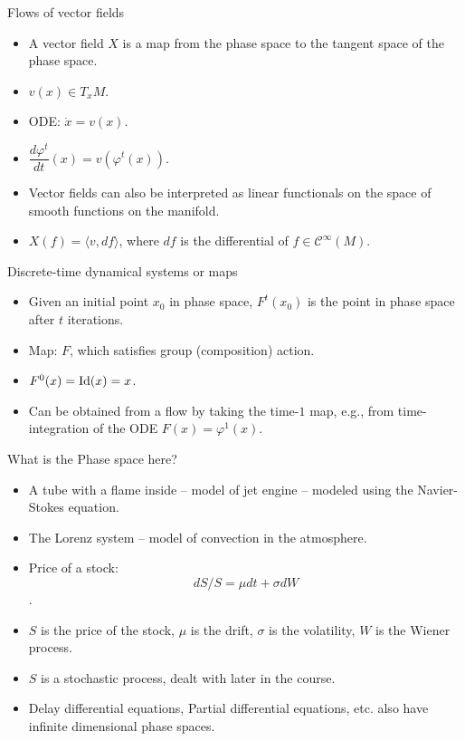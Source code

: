\documentclass[final]{beamer}
\begin{document}
	\begin{frame}{Flows of vector fields}
		\begin{itemize}
			\item A vector field $X$ is a map from the phase space to the tangent space of the phase space.
			\pause
			\item $v(x) \in T_xM$.
			\pause
			\item ODE: $\dot{x} = v(x)$.
			\pause
		\item $\dfrac{d\varphi^t}{dt}(x) = v(\varphi^t(x))$.
		\pause
		\item Vector fields can also be interpreted as linear functionals on the space of smooth functions on the manifold.
		\pause
		\item $X(f) = \langle v, df \rangle$, where $df$ is the differential of $f \in \mathcal{C}^\infty(M)$.

		\end{itemize}
	\end{frame}
	

	\begin{frame}{Discrete-time dynamical systems or maps}
		\begin{itemize}
			\item Given an initial point $x_0$ in phase space, $F^t(x_0)$ is the point in phase space after $t$ iterations.
			\pause
			\item Map: $F$, which satisfies group (composition) action.
			\pause
			\item $F^0(x) = {\rm Id}(x) = x$.
			\pause
			\item Can be obtained from a flow by taking the time-$1$ map, e.g., from time-integration of the ODE $F(x) = \varphi^1(x)$.
			
			
		\end{itemize}
	\end{frame}

	\begin{frame}{What is the Phase space here?}
		\begin{itemize}
		\item A tube with a flame inside -- model of jet engine -- modeled using the Navier-Stokes equation.
		\pause
		\item The Lorenz system -- model of convection in the atmosphere.
		\pause
		\item Price of a stock:
			$$dS/S = \mu dt + \sigma dW$$.
			\pause
			\item $S$ is the price of the stock, $\mu$ is the drift, $\sigma$ is the volatility, $W$ is the Wiener process.
			\pause
			\item $S$ is a stochastic process, dealt with later in the course.
		\item Delay differential equations, Partial differential equations, etc. also have infinite dimensional phase spaces.

		\end{itemize}
	\end{frame}
\end{document}

